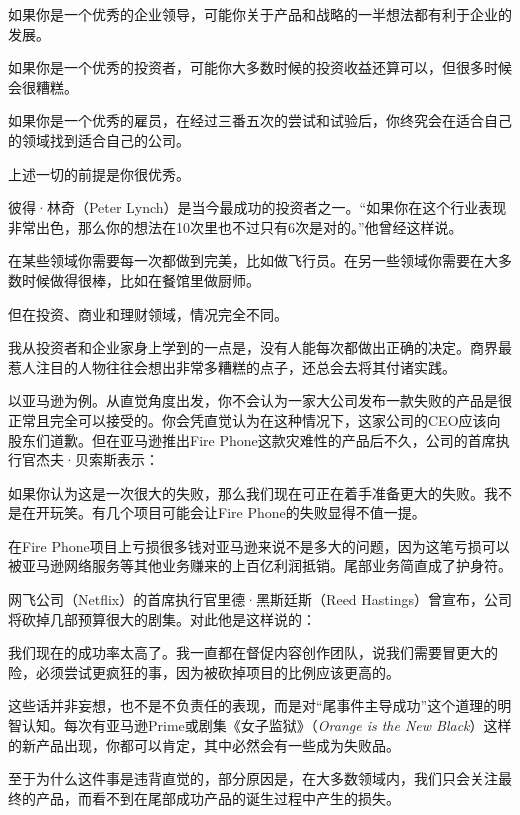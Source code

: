 如果你是一个优秀的企业领导，可能你关于产品和战略的一半想法都有利于企业的发展。

如果你是一个优秀的投资者，可能你大多数时候的投资收益还算可以，但很多时候会很糟糕。

如果你是一个优秀的雇员，在经过三番五次的尝试和试验后，你终究会在适合自己的领域找到适合自己的公司。

上述一切的前提是你很优秀。

彼得·林奇（Peter Lynch）是当今最成功的投资者之一。“如果你在这个行业表现非常出色，那么你的想法在10次里也不过只有6次是对的。”他曾经这样说。

在某些领域你需要每一次都做到完美，比如做飞行员。在另一些领域你需要在大多数时候做得很棒，比如在餐馆里做厨师。

但在投资、商业和理财领域，情况完全不同。

我从投资者和企业家身上学到的一点是，没有人能每次都做出正确的决定。商界最惹人注目的人物往往会想出非常多糟糕的点子，还总会去将其付诸实践。

以亚马逊为例。从直觉角度出发，你不会认为一家大公司发布一款失败的产品是很正常且完全可以接受的。你会凭直觉认为在这种情况下，这家公司的CEO应该向股东们道歉。但在亚马逊推出Fire Phone这款灾难性的产品后不久，公司的首席执行官杰夫·贝索斯表示：

{\kaishu

如果你认为这是一次很大的失败，那么我们现在可正在着手准备更大的失败。我不是在开玩笑。有几个项目可能会让Fire Phone的失败显得不值一提。

}

在Fire Phone项目上亏损很多钱对亚马逊来说不是多大的问题，因为这笔亏损可以被亚马逊网络服务等其他业务赚来的上百亿利润抵销。尾部业务简直成了护身符。

网飞公司（Netflix）的首席执行官里德·黑斯廷斯（Reed Hastings）曾宣布，公司将砍掉几部预算很大的剧集。对此他是这样说的：

{\kaishu

我们现在的成功率太高了。我一直都在督促内容创作团队，说我们需要冒更大的险，必须尝试更疯狂的事，因为被砍掉项目的比例应该更高的。

}

这些话并非妄想，也不是不负责任的表现，而是对“尾事件主导成功”这个道理的明智认知。每次有亚马逊Prime或剧集《女子监狱》（\textit{Orange is the New Black}）这样的新产品出现，你都可以肯定，其中必然会有一些成为失败品。

至于为什么这件事是违背直觉的，部分原因是，在大多数领域内，我们只会关注最终的产品，而看不到在尾部成功产品的诞生过程中产生的损失。

